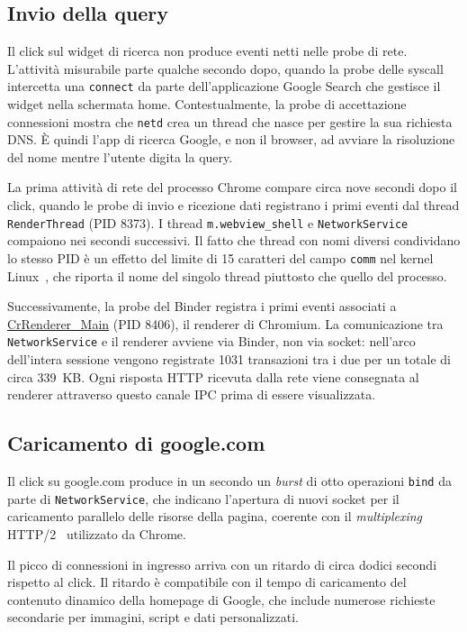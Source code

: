 \subsection{Invio della query}

Il click sul widget di ricerca non produce eventi netti nelle probe di rete. L'attività misurabile parte qualche secondo dopo, quando la probe delle syscall intercetta una \texttt{connect} da parte dell'applicazione Google Search che gestisce il widget nella schermata home. Contestualmente, la probe di accettazione connessioni mostra che \texttt{netd} crea un thread che  nasce per gestire la sua richiesta DNS. È quindi l'app di ricerca Google, e non il browser, ad avviare la risoluzione del nome mentre l'utente digita la query.

La prima attività di rete del processo Chrome compare circa nove secondi dopo il click, quando le probe di invio e ricezione dati registrano i primi eventi dal thread \texttt{RenderThread} (PID 8373). I thread \texttt{m.webview\_shell} e \texttt{NetworkService} compaiono nei secondi successivi. Il fatto che thread con nomi diversi condividano lo stesso PID è un effetto del limite di 15 caratteri del campo \texttt{comm} nel kernel Linux~\cite{linux_task_struct}, che riporta il nome del singolo thread piuttosto che quello del processo.

Successivamente, la probe del Binder registra i primi eventi associati a \url{CrRenderer\_Main} (PID 8406),
il renderer di Chromium. La comunicazione tra \texttt{NetworkService}
e il renderer avviene via Binder, non via socket: nell'arco dell'intera sessione vengono registrate 1031 transazioni tra i 
due per un totale di circa 339~KB. Ogni risposta HTTP ricevuta dalla rete viene consegnata al renderer attraverso questo 
canale IPC prima di essere visualizzata.

\subsection{Caricamento di google.com}

Il click su google.com produce in un secondo un \textit{burst} di otto operazioni \texttt{bind} da parte di \texttt{NetworkService}, che indicano l'apertura di nuovi socket per il caricamento parallelo delle risorse della pagina, coerente con il \textit{multiplexing} HTTP/2~\cite{http2_rfc} utilizzato da Chrome.

Il picco di connessioni in ingresso arriva con un ritardo di circa dodici secondi rispetto al click. Il ritardo è compatibile con il tempo di caricamento del contenuto dinamico della homepage di Google, che include numerose richieste secondarie per immagini, script e dati personalizzati.


